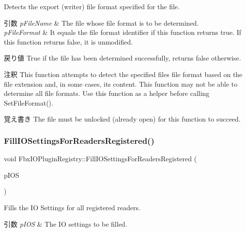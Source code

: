 Detects the export (writer) file format specified for the file. 
\begin{DoxyParams}{引数}
{\em p\+File\+Name} & The file whose file format is to be determined. \\
\hline
{\em p\+File\+Format} & It equals the file format identifier if this function returns {\ttfamily true}. If this function returns {\ttfamily false}, it is unmodified. \\
\hline
\end{DoxyParams}
\begin{DoxyReturn}{戻り値}
{\ttfamily True} if the file has been determined successfully, returns {\ttfamily false} otherwise. 
\end{DoxyReturn}
\begin{DoxyRemark}{注釈}
This function attempts to detect the specified file\textquotesingle{}s file format based on the file extension and, in some cases, its content. This function may not be able to determine all file formats. Use this function as a helper before calling {\ttfamily Set\+File\+Format()}. 
\end{DoxyRemark}
\begin{DoxyNote}{覚え書き}
The file must be unlocked (already open) for this function to succeed. 
\end{DoxyNote}
\mbox{\label{class_fbx_i_o_plugin_registry_a92c7a20e1eb9948e83c4915c47fd63dc}} 
\subsubsection{\texorpdfstring{Fill\+I\+O\+Settings\+For\+Readers\+Registered()}{FillIOSettingsForReadersRegistered()}}
{\footnotesize\ttfamily void Fbx\+I\+O\+Plugin\+Registry\+::\+Fill\+I\+O\+Settings\+For\+Readers\+Registered (\begin{DoxyParamCaption}\item[{\hyperlink{class_fbx_i_o_settings}{Fbx\+I\+O\+Settings} \&}]{p\+I\+OS }\end{DoxyParamCaption})}

Fills the IO Settings for all registered readers. 
\begin{DoxyParams}{引数}
{\em p\+I\+OS} & The IO settings to be filled. \\
\hline
\end{DoxyParams}
\mbox{\label{class_fbx_i_o_plugin_registry_adbb47a3ba26c90c49988f11cd30b21d8}} 

